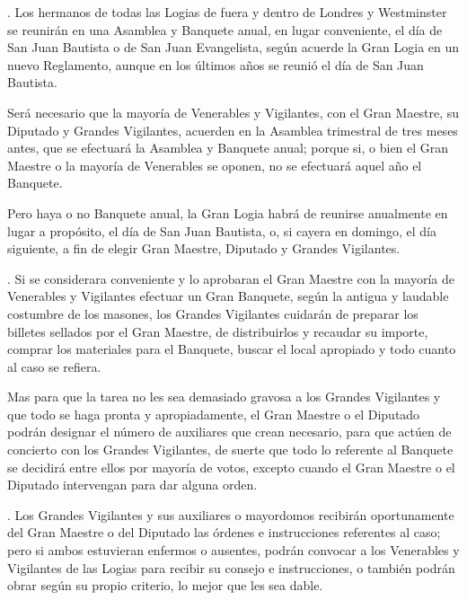 \documentclass[a4paper,12pt,twoside]{book}
\begin{document}
\vspace{0.3cm}

. Los hermanos de todas las Logias de fuera y dentro de Londres y Westminster se reunirán en una Asamblea y Banquete anual, en lugar conveniente, el día de San Juan Bautista o de San Juan Evangelista, según acuerde la Gran Logia en un nuevo Reglamento, aunque en los últimos años se reunió el día de San Juan Bautista.

\noindent Será necesario que la mayoría de Venerables y Vigilantes, con el Gran Maestre, su Diputado y Grandes Vigilantes, acuerden en la Asamblea trimestral de tres meses antes, que se efectuará la Asamblea y Banquete anual; porque si, o bien el Gran Maestre o la mayoría de Venerables se oponen, no se efectuará aquel año el Banquete.

\noindent Pero haya o no Banquete anual, la Gran Logia habrá de reunirse anualmente en lugar a propósito, el día de San Juan Bautista, o, si cayera en domingo, el día siguiente, a fin de elegir Gran Maestre, Diputado y Grandes Vigilantes.

\vspace{0.3cm}

. Si se considerara conveniente y lo aprobaran el Gran Maestre con la mayoría de Venerables y Vigilantes efectuar un Gran Banquete, según la antigua y laudable costumbre de los masones, los Grandes Vigilantes cuidarán de preparar los billetes sellados por el Gran Maestre, de distribuirlos y recaudar su importe, comprar los materiales para el Banquete, buscar el local apropiado y todo cuanto al caso se refiera.

\noindent Mas para que la tarea no les sea demasiado gravosa a los Grandes Vigilantes y que todo se haga pronta y apropiadamente, el Gran Maestre o el Diputado podrán designar el número de auxiliares que crean necesario, para que actúen de concierto con los Grandes Vigilantes, de suerte que todo lo referente al Banquete se decidirá entre ellos por mayoría de votos, excepto cuando el Gran Maestre o el Diputado intervengan para dar alguna orden.

\vspace{0.3cm}

. Los Grandes Vigilantes y sus auxiliares o mayordomos recibirán oportunamente del Gran Maestre o del Diputado las órdenes e instrucciones referentes al caso; pero si ambos estuvieran enfermos o ausentes, podrán convocar a los Venerables y Vigilantes de las Logias para recibir su consejo e instrucciones, o también podrán obrar según su propio criterio, lo mejor que les sea dable.
\end{document}
